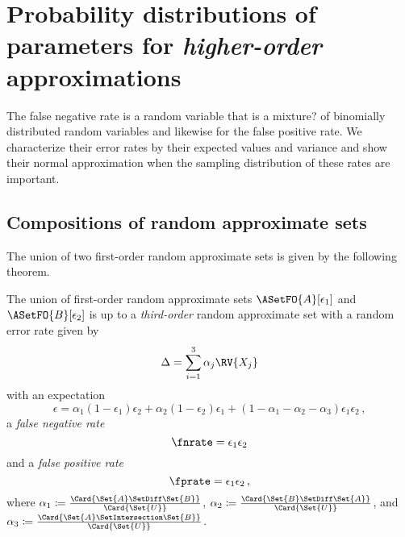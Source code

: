 \documentclass[ ../main.tex]{subfiles}
\begin{document}
\section{Probability distributions of parameters for \emph{higher-order} approximations}
\label{sec:characteristics2}


The false negative rate is a random variable that is a mixture? of binomially distributed random variables and likewise for the false positive rate.
We characterize their error rates by their expected values and variance and show their normal approximation when the sampling distribution of these rates are important.

\subsection{Compositions of random approximate sets}
\label{sec:set_theory}
The union of two first-order random approximate sets is given by the following theorem.
\begin{theorem}
	The union of first-order random approximate sets $\ASetFO{A}[\epsilon_1]$ and $\ASetFO{B}[\epsilon_2]$ is up to a \emph{third-order} random approximate set with a random error rate given by
	\begin{equation}
		\Delta = \sum_{i=1}^{3} \alpha_j \RV{X_j}
	\end{equation}
	with an expectation 
	\begin{equation}
		\epsilon = \alpha_1 (1-\epsilon_1)\epsilon_2 + \alpha_2 (1-\epsilon_2)\epsilon_1 + (1-\alpha_1 - \alpha_2 - \alpha_3)\epsilon_1 \epsilon_2\,,
	\end{equation}
	a \emph{false negative rate}
	\begin{equation}
		\fnrate = \epsilon_1 \epsilon_2
	\end{equation}
	and a \emph{false positive rate}
	\begin{equation}
		\fprate = \epsilon_1 \epsilon_2\,,
	\end{equation}
	where $\alpha_1 \coloneqq \frac{\Card{\Set{A} \SetDiff \Set{B}}}{\Card{\Set{U}}}$, $\alpha_2 \coloneqq \frac{\Card{\Set{B} \SetDiff \Set{A}}}{\Card{\Set{U}}}$, and $\alpha_3 \coloneqq \frac{\Card{\Set{A} \SetIntersection \Set{B}}}{\Card{\Set{U}}}$.
\end{theorem}
\end{document}
